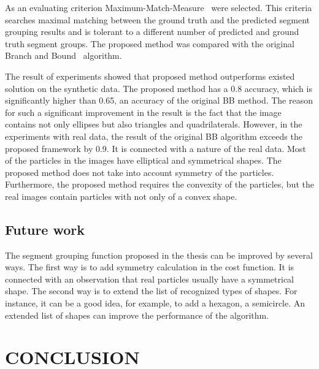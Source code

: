 \documentclass{lutmscthesis}[2010/09/22]
\begin{document}
As an evaluating criterion Maximum-Match-Measure~\cite{mm-estimate} were selected.  This criteria searches maximal matching between the ground truth and the predicted segment grouping results and is tolerant to a different number of predicted and ground truth segment groups. The proposed method was compared with the original Branch and Bound~\cite{zafari-bb} algorithm.

The result of experiments showed that proposed method outperforms existed solution on the synthetic data. The proposed method has a 0.8 accuracy, which is significantly higher than 0.65, an accuracy of the original BB method. The reason for such a significant improvement in the result is the fact that the image contains not only ellipses but also triangles and quadrilaterals. However, in the experiments with real data, the result of the original BB algorithm exceeds the proposed framework by 0.9. It is connected with a nature of the real data. Most of the particles in the images have elliptical and symmetrical shapes. The proposed method does not take into account symmetry of the particles.  Furthermore, the proposed method requires the convexity of the particles, but the real images contain particles with not only of a convex shape. 

\subsection{Future work}

The segment grouping function proposed in the thesis can be improved by several ways.
The first way is to add symmetry calculation in the cost function. It is connected with an observation that real particles usually have a symmetrical shape. 
The second way is to extend the list of recognized types of shapes. For instance, it can be a good idea, for example, to add a hexagon, a semicircle. An extended list of shapes can improve the performance of the algorithm.


\section{CONCLUSION}
\label{sec:conclusion}
\end{document}
